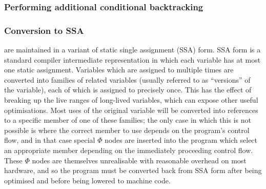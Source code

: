 
\subsubsection{Performing additional conditional backtracking}

\subsubsection{Conversion to SSA}
\label{sect:ssa}

\STateMachines are maintained in a variant of static single assignment (SSA) form.
SSA form is a standard compiler intermediate representation in which each variable has at most one static assignment\needCite{}.
Variables which are assigned to multiple times are converted into families of related variables (usually referred to as ``versions'' of the variable), each of which is assigned to precisely once.
This has the effect of breaking up the live ranges of long-lived variables, which can expose other useful optimisations.
Most uses of the original variable will be converted into references to a specific member of one of these families; the only case in which this is not possible is where the correct member to use depends on the program's control flow, and in that case special $\Phi$ nodes are inserted into the program which select an appropriate member depending on the immediately proceeding control flow.
These $\Phi$ nodes are themselves unrealisable with reasonable overhead on most hardware, and so the program must be converted back from SSA form after being optimised and before being lowered to machine code.

